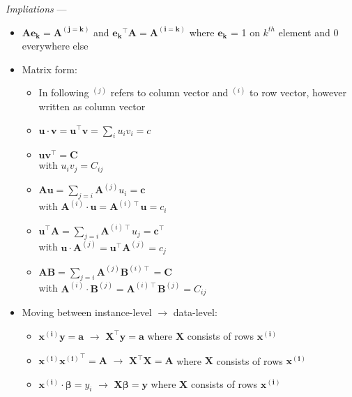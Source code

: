 \emph{Impliations} ---

\begin{itemize}
    \item $\boldsymbol{A} \boldsymbol{e_k} = \boldsymbol{A^{(j=k)}}$ and $\boldsymbol{e_k}^\intercal \boldsymbol{A} = \boldsymbol{A^{(i=k)}}$ where $\boldsymbol{e_k}$ = 1 on $k^{th}$ element and 0 everywhere else
    \item Matrix form:
    \begin{itemize}
        \item In following $^{(j)}$ refers to column vector and $^{(i)}$ to row vector, however written as column vector
        \item $\boldsymbol{u} \cdot \boldsymbol{v} = \boldsymbol{u}^\intercal \boldsymbol{v} = \sum_i u_i v_i = c$
        \item $\boldsymbol{u} \boldsymbol{v}^\intercal = \boldsymbol{C}$\\
        with $u_i v_j = C_{ij}$
        \item $\boldsymbol{A} \boldsymbol{u} = \sum_{j=i} \boldsymbol{A}^{(j)} u_i = \boldsymbol{c}$\\
        with $\boldsymbol{A}^{(i)} \cdot \boldsymbol{u} = \boldsymbol{A}^{(i) \intercal} \boldsymbol{u} = c_i$
        \item $\boldsymbol{u}^\intercal \boldsymbol{A} = \sum_{j=i} \boldsymbol{A}^{(i) \intercal} u_j = \boldsymbol{c}^\intercal$\\
        with $\boldsymbol{u} \cdot \boldsymbol{A}^{(j)} = \boldsymbol{u}^\intercal \boldsymbol{A}^{(j)} = c_j$
        \item $\boldsymbol{A} \boldsymbol{B} = \sum_{j=i} \boldsymbol{A}^{(j)} \boldsymbol{B}^{(i) \intercal} = \boldsymbol{C}$\\
        with $\boldsymbol{A}^{(i)} \cdot \boldsymbol{B}^{(j)} = \boldsymbol{A}^{(i) \intercal} \boldsymbol{B}^{(j)} = C_{ij}$
    \end{itemize}
    \item Moving between instance-level $\rightarrow$ data-level:
    \begin{itemize}
        \item $\boldsymbol{x^{(i)}} \boldsymbol{y} = \boldsymbol{a}$ $\rightarrow$ $\boldsymbol{X}^\intercal \boldsymbol{y} = \boldsymbol{a}$ where $\boldsymbol{X}$ consists of rows $\boldsymbol{x^{(i)}}$
        \item $\boldsymbol{x^{(i)}} \boldsymbol{x^{(i)}}^\intercal = \boldsymbol{A}$ $\rightarrow$ $\boldsymbol{X}^\intercal \boldsymbol{X} = \boldsymbol{A}$ where $\boldsymbol{X}$ consists of rows $\boldsymbol{x^{(i)}}$
        \item $\boldsymbol{x^{(i)}} \cdot \boldsymbol{\beta} = y_i$ $\rightarrow$ $\boldsymbol{X}\boldsymbol{\beta} = \boldsymbol{y}$ where $\boldsymbol{X}$ consists of rows $\boldsymbol{x^{(i)}}$
    \end{itemize}
\end{itemize}

